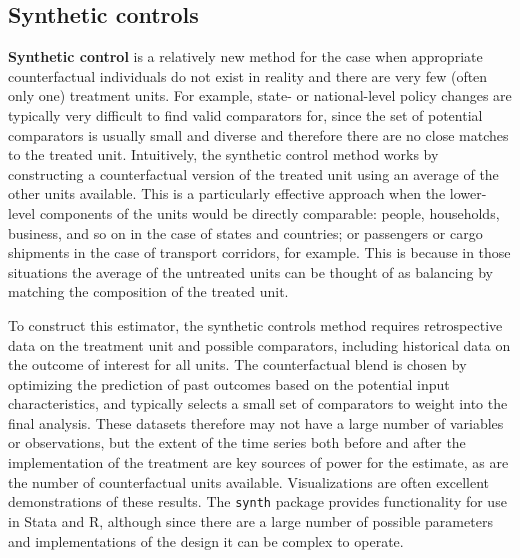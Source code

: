\subsection{Synthetic controls}

\textbf{Synthetic control} is a relatively new method
for the case when appropriate counterfactual individuals
do not exist in reality and there are very few (often only one) treatment units.\cite{abadie2015comparative}
For example, state- or national-level policy changes
are typically very difficult to find valid comparators for,
since the set of potential comparators is usually small and diverse
and therefore there are no close matches to the treated unit.
Intuitively, the synthetic control method works
by constructing a counterfactual version of the treated unit
using an average of the other units available.\cite{abadie2010synthetic}
This is a particularly effective approach
when the lower-level components of the units would be directly comparable:
people, households, business, and so on in the case of states and countries;
or passengers or cargo shipments in the case of transport corridors, for example.\cite{gobillon2016regional}
This is because in those situations the average of the untreated units
can be thought of as balancing by matching the composition of the treated unit.

To construct this estimator, the synthetic controls method requires
retrospective data on the treatment unit and possible comparators,
including historical data on the outcome of interest for all units.
The counterfactual blend is chosen by optimizing the prediction of past outcomes
based on the potential input characteristics,
and typically selects a small set of comparators to weight into the final analysis.
These datasets therefore may not have a large number of variables or observations,
but the extent of the time series both before and after the implementation
of the treatment are key sources of power for the estimate,
as are the number of counterfactual units available.
Visualizations are often excellent demonstrations of these results.
The \texttt{synth} package provides functionality for use in Stata and R,
although since there are a large number of possible parameters
and implementations of the design it can be complex to operate.
